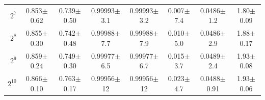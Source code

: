 \begin{table}[t]
{\begin{tabular}{r cc cc c cc}
  $2^{7}$ & 0.853\tiny{$\pm$0.62} & 0.739\tiny{$\pm$0.50} & 0.99993\tiny{$\pm$3.1} & 0.99993\tiny{$\pm$3.2} & 0.007\tiny{$\pm$7.4} & 0.0486\tiny{$\pm$1.2} & 1.80\tiny{$\pm$0.09} \\
  $2^{8}$ & 0.855\tiny{$\pm$0.30} & 0.742\tiny{$\pm$0.48} & 0.99988\tiny{$\pm$7.7} & 0.99988\tiny{$\pm$7.9} & 0.010\tiny{$\pm$5.0} & 0.0486\tiny{$\pm$2.9} & 1.88\tiny{$\pm$0.17} \\
  $2^{9}$ & 0.859\tiny{$\pm$0.24} & 0.749\tiny{$\pm$0.30} & 0.99977\tiny{$\pm$6.5} & 0.99977\tiny{$\pm$6.7} & 0.015\tiny{$\pm$3.7} & 0.0489\tiny{$\pm$2.4} & 1.93\tiny{$\pm$0.08} \\
  $2^{10}$ & 0.866\tiny{$\pm$0.10} & 0.763\tiny{$\pm$0.17} & 0.99956\tiny{$\pm$12} & 0.99956\tiny{$\pm$12} & 0.023\tiny{$\pm$4.7} & 0.0488\tiny{$\pm$0.91} & 1.93\tiny{$\pm$0.06} \\
\bottomrule
\end{tabular}}
\end{table}

